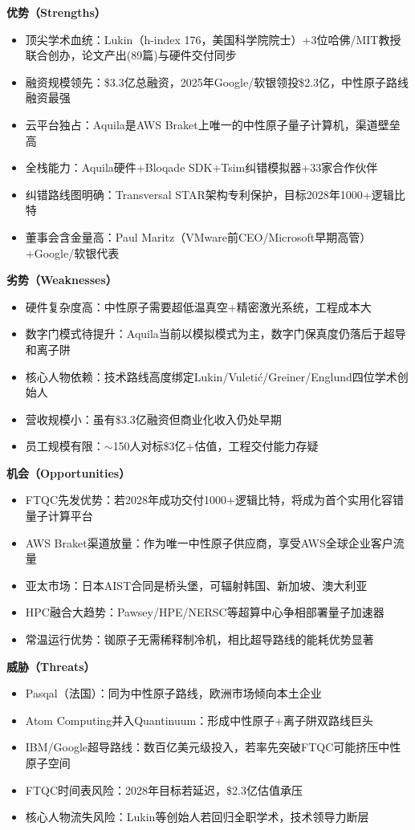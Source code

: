\documentclass[11pt,a4paper]{ctexart}
\begin{document}
\textbf{优势（Strengths）}
\begin{itemize}
\item 顶尖学术血统：Lukin（h-index 176，美国科学院院士）+3位哈佛/MIT教授联合创办，论文产出(89篇)与硬件交付同步
\item 融资规模领先：\$3.3亿总融资，2025年Google/软银领投\$2.3亿，中性原子路线融资最强
\item 云平台独占：Aquila是AWS Braket上唯一的中性原子量子计算机，渠道壁垒高
\item 全栈能力：Aquila硬件+Bloqade SDK+Tsim纠错模拟器+33家合作伙伴
\item 纠错路线图明确：Transversal STAR架构专利保护，目标2028年1000+逻辑比特
\item 董事会含金量高：Paul Maritz（VMware前CEO/Microsoft早期高管）+Google/软银代表
\end{itemize}

\textbf{劣势（Weaknesses）}
\begin{itemize}
\item 硬件复杂度高：中性原子需要超低温真空+精密激光系统，工程成本大
\item 数字门模式待提升：Aquila当前以模拟模式为主，数字门保真度仍落后于超导和离子阱
\item 核心人物依赖：技术路线高度绑定Lukin/Vuletić/Greiner/Englund四位学术创始人
\item 营收规模小：虽有\$3.3亿融资但商业化收入仍处早期
\item 员工规模有限：$\sim$150人对标\$3亿+估值，工程交付能力存疑
\end{itemize}

\textbf{机会（Opportunities）}
\begin{itemize}
\item FTQC先发优势：若2028年成功交付1000+逻辑比特，将成为首个实用化容错量子计算平台
\item AWS Braket渠道放量：作为唯一中性原子供应商，享受AWS全球企业客户流量
\item 亚太市场：日本AIST合同是桥头堡，可辐射韩国、新加坡、澳大利亚
\item HPC融合大趋势：Pawsey/HPE/NERSC等超算中心争相部署量子加速器
\item 常温运行优势：铷原子无需稀释制冷机，相比超导路线的能耗优势显著
\end{itemize}

\textbf{威胁（Threats）}
\begin{itemize}
\item Pasqal（法国）：同为中性原子路线，欧洲市场倾向本土企业
\item Atom Computing并入Quantinuum：形成中性原子+离子阱双路线巨头
\item IBM/Google超导路线：数百亿美元级投入，若率先突破FTQC可能挤压中性原子空间
\item FTQC时间表风险：2028年目标若延迟，\$2.3亿估值承压
\item 核心人物流失风险：Lukin等创始人若回归全职学术，技术领导力断层
\end{itemize}
\end{document}
